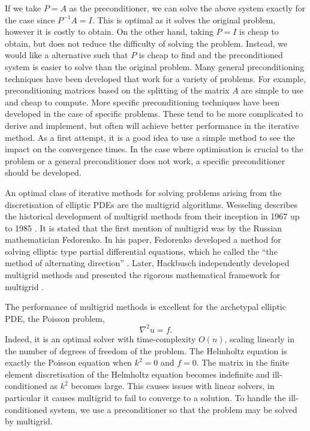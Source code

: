 If we take $P=A$ as the preconditioner, we can solve the above system exactly for the case since $P^{-1}A=I$. 
This is optimal as it solves the original problem, however it is costly to obtain.
On the other hand, taking $P=I$ is cheap to obtain, but does not reduce the difficulty of solving the problem.
Instead, we would like a alternative such that $P$ is cheap to find and the preconditioned system is easier to solve than the original problem.
Many general preconditioning techniques have been developed that work for a variety of problems.
For example, preconditioning matrices based on the splitting of the matrix $A$ are simple to use and cheap to compute.
More specific preconditioning techniques have been developed in the case of specific problems.
These tend to be more complicated to derive and implement, but often will achieve better performance in the iterative method.
As a first attempt, it is a good idea to use a simple method to see the impact on the convergence times.
In the case where optimisation is crucial to the problem or a general preconditioner does not work, a specific preconditioner should be developed.


An optimal class of iterative methods for solving problems arising from the discretisation of elliptic PDEs are the multigrid algorithms.
Wesseling describes the historical development of multigrid methods from their inception in 1967 up to 1985 \cite{wesseling}.
It is stated that the first mention of multigrid was by the Russian mathematician Fedorenko.
In his paper, Fedorenko developed a method for solving elliptic type partial differential equations, which he called the ``the method of alternating direction'' \cite{fedorenko}.
Later, Hackbusch independently developed multigrid methods and presented the rigorous mathematical framework for multigrid \cite{hackbusch}.

The performance of multigrid methods is excellent for the archetypal elliptic PDE, the Poisson problem,
\begin{equation}
	\nabla^2 u = f. \label{eqn:poisson}
\end{equation}
Indeed, it is an optimal solver with time-complexity $O(n)$, scaling linearly in the number of degrees of freedom of the problem.
The Helmholtz equation is exactly the Poisson equation when $k^2=0$ and $f=0$.
The matrix in the finite element discretisation of the Helmholtz equation becomes indefinite and ill-conditioned as $k^2$ becomes large.
This causes issues with linear solvers, in particular it causes multigrid to fail to converge to a solution.
To handle the ill-conditioned system, we use a preconditioner so that the problem may be solved by multigrid.


